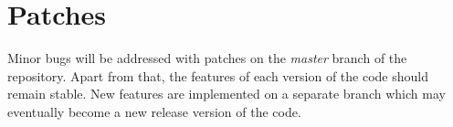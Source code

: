\documentclass[a4paper,10pt]{article}
\begin{document}
\section{Patches}

Minor bugs will be addressed with patches on the \textit{master} branch of the repository. Apart from that, the features of each version of
the code should remain stable. New features are implemented on a separate branch which may eventually become a new release version of the
code.





\end{document}
